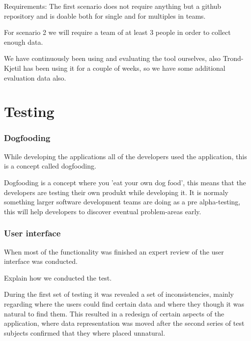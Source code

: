 Requirements:
The first scenario does not require anything but a github repository and is doable both for single and for multiples in teams.

For scenario 2 we will require a team of at least 3 people in order to collect enough data. 

We have continuously been using and evaluating the tool ourselves, also Trond-Kjetil has been using it for a couple of weeks, so we have some additional evaluation
data also. 


\section{Testing}
\subsubsection{Dogfooding}
While developing the applications all of the developers used the application, this is a concept called dogfooding.

Dogfooding is a concept where you 'eat your own dog food', this means that the developers are testing their own produkt while developing it. It is normaly something larger software development teams are doing as a pre alpha-testing, this will help developers to discover eventual problem-areas early.

\subsubsection{User interface}
When most of the functionality was finished an expert review of the user interface was conducted.

Explain how we conducted the test.

During the first set of testing it was revealed a set of inconsistencies, mainly regarding where the users could find certain data and where they though it was natural to find them. 
This resulted in a redesign of certain aspects of the application, where data representation was moved after the second series of test subjects confirmed that they where placed unnatural.
